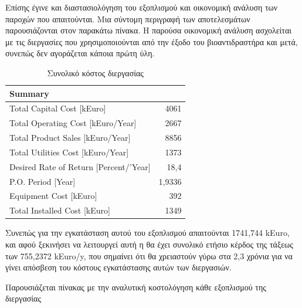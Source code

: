 \documentclass[11pt]{article}
\begin{document}
Επίσης έγινε και διαστασιολόγηση του εξοπλισμού και οικονομική ανάλυση
των παροχών που απαιτούνται. Μια σύντομη περιγραφή των αποτελεσμάτων
παρουσιάζονται στον παρακάτω πίνακα. Η παρούσα οικονομική ανάλυση
ασχολείται με τις διεργασίες που χρησιμοποιούνται από την έξοδο του
βιοαντιδραστήρα και μετά, συνεπώς δεν αγοράζεται κάποια πρώτη ύλη.

\begin{table}[htbp]
\caption{Συνολικό κόστος διεργασίας}
\centering
\begin{tabular}{lr}
Summary & \\
\hline
Total Capital Cost [kEuro] & 4061\\
Total Operating Cost [kEuro/Year] & 2667\\
Total Product Sales [kEuro/Year] & 8856\\
Total Utilities Cost [kEuro/Year] & 1373\\
Desired Rate of Return [Percent/'Year] & 18,4\\
P.O. Period [Year] & 1,9336\\
Equipment Cost [kEuro] & 392\\
Total Installed Cost [kEuro] & 1349\\
\end{tabular}
\end{table}

Συνεπώς για την εγκατάσταση αυτού του εξοπλισμού απαιτούνται 1741,744
kEuro, και αφού ξεκινήσει να λειτουργεί αυτή η θα έχει συνολικό ετήσιο
κέρδος της τάξεως των 755,2372 kEuro/y, που σημαίνει ότι θα χρειαστούν
γύρω στα 2,3 χρόνια για να γίνει απόσβεση του κόστους εγκατάστασης αυτών
των διεργασιών.

Παρουσιάζεται πίνακας με την αναλυτική κοστολόγηση κάθε εξοπλισμού της
διεργασίας
\end{document}
